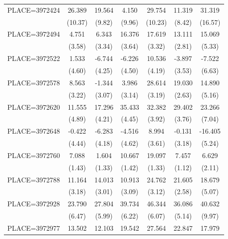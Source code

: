{\begin{tabular}{l*{6}{c}}
PLACE=3972424       &      26.389&      19.564&       4.150&      29.754&      11.319&      31.319\\
                    &     (10.37)&      (9.82)&      (9.96)&     (10.23)&      (8.42)&     (16.57)\\
PLACE=3972494       &       4.751&       6.343&      16.376&      17.619&      13.111&      15.069\\
                    &      (3.58)&      (3.34)&      (3.64)&      (3.32)&      (2.81)&      (5.33)\\
PLACE=3972522       &       1.533&      -6.744&      -6.226&      10.536&      -3.897&      -7.522\\
                    &      (4.60)&      (4.25)&      (4.50)&      (4.19)&      (3.53)&      (6.63)\\
PLACE=3972578       &       8.563&      -1.344&       3.986&      28.614&      19.030&      14.890\\
                    &      (3.22)&      (3.07)&      (3.14)&      (3.19)&      (2.63)&      (5.16)\\
PLACE=3972620       &      11.555&      17.296&      35.433&      32.382&      29.402&      23.266\\
                    &      (4.89)&      (4.21)&      (4.45)&      (3.92)&      (3.76)&      (7.04)\\
PLACE=3972648       &      -0.422&      -6.283&      -4.516&       8.994&      -0.131&     -16.405\\
                    &      (4.44)&      (4.18)&      (4.62)&      (3.61)&      (3.18)&      (5.24)\\
PLACE=3972760       &       7.088&       1.604&      10.667&      19.097&       7.457&       6.629\\
                    &      (1.43)&      (1.33)&      (1.42)&      (1.33)&      (1.12)&      (2.11)\\
PLACE=3972788       &      11.164&      14.013&      10.913&      24.762&      21.605&      18.679\\
                    &      (3.18)&      (3.01)&      (3.09)&      (3.12)&      (2.58)&      (5.07)\\
PLACE=3972928       &      23.790&      27.804&      39.734&      46.344&      36.086&      40.632\\
                    &      (6.47)&      (5.99)&      (6.22)&      (6.07)&      (5.14)&      (9.97)\\
PLACE=3972977       &      13.502&      12.103&      19.542&      27.564&      22.847&      17.979\\

\end{tabular}}
